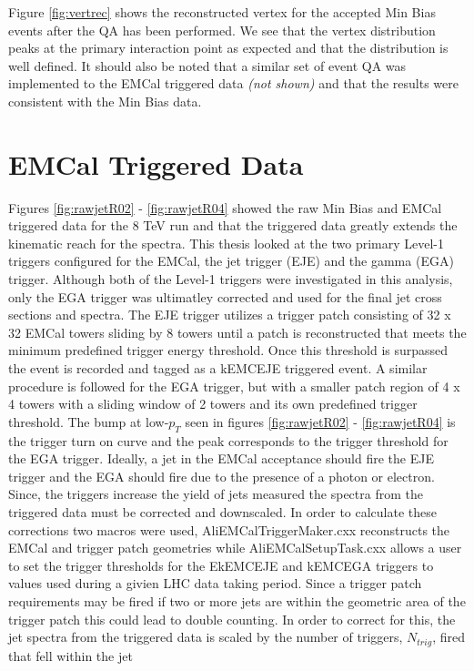 \noindent 
Figure \ref{fig:vertrec} shows the reconstructed vertex for the accepted Min Bias events after the QA has been performed.  We see that the vertex distribution peaks at the primary interaction point as expected and that the distribution is well defined.  It should also be noted that a similar set of event QA was implemented to the EMCal triggered data \textit{(not shown)} and that the results were consistent with the Min Bias data.


\section{EMCal Triggered Data}

Figures \ref{fig:rawjetR02} - \ref{fig:rawjetR04} showed the raw Min Bias and EMCal triggered data for the 8 TeV run and that the triggered data greatly extends the kinematic reach for the spectra.  This thesis looked at the two primary Level-1 triggers configured for the EMCal, the jet trigger (EJE) and the gamma (EGA) trigger\cite{Bourrion:2010js}.  Although both of the Level-1 triggers were investigated in this analysis, only the EGA trigger was ultimatley corrected  and used for the final jet cross sections and spectra.  The EJE trigger utilizes a trigger patch consisting of 32 x 32 EMCal towers sliding by 8 towers until a patch is reconstructed that meets the minimum predefined trigger energy threshold.  Once this threshold is surpassed the event is recorded and tagged as a kEMCEJE triggered event.  A similar procedure is followed for the EGA trigger, but with a smaller patch region of 4 x 4 towers with a sliding window of 2 towers and its own predefined trigger threshold.  The bump at low-$p_{T}$ seen in figures \ref{fig:rawjetR02} - \ref{fig:rawjetR04} is the trigger turn on curve and the peak corresponds to the trigger threshold for the EGA trigger.  Ideally, a jet in the EMCal acceptance should fire the EJE trigger and the EGA should fire due to the presence of a photon or electron.  Since, the triggers increase the yield of jets measured the spectra from the triggered data must be corrected and downscaled.  In order to calculate these corrections two macros were used, AliEMCalTriggerMaker.cxx reconstructs the EMCal and trigger patch geometries while AliEMCalSetupTask.cxx allows a user to set the trigger thresholds for the EkEMCEJE and kEMCEGA triggers to values used during a givien LHC data taking period.  Since a trigger patch requirements may be fired if two or more jets are within the geometric area of the trigger patch this could lead to double counting.  In order to correct for this, the jet spectra from the triggered data is scaled by the number of triggers, $N_{trig}$, fired that fell within the jet

